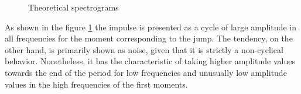 \documentclass[a4paper]{article}
\begin{document}
\begin{figure}[H]
		\vspace{0.00mm}
		\vspace{0.00mm}
		\vspace{0.00mm}
		\caption{Theoretical spectrograms} \label{fig:espect_teo}
	\end{figure}
	
	As shown in the figure \ref{fig:espect_teo} the impulse is presented as a cycle of large amplitude in all frequencies for the moment corresponding to the jump. The tendency, on the other hand, is primarily shown as noise, given that it is strictly a non-cyclical behavior. Nonetheless, it has the characteristic of taking higher amplitude values towards the end of the period for low frequencies and unusually low amplitude values in the high frequencies of the first moments.
	
\end{document}

